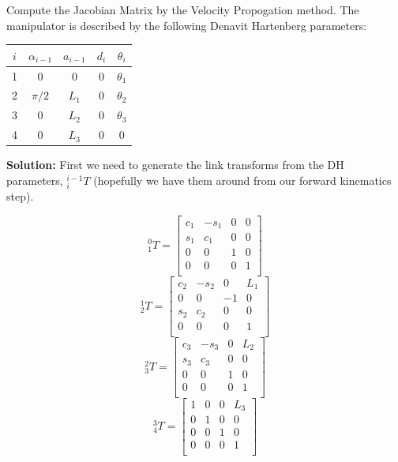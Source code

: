 \begin{Example}\label{JacobianExampleOne}
Compute the Jacobian Matrix by the Velocity Propogation method.  The manipulator is described by the following Denavit Hartenberg parameters:

\begin{center}
\begin{tabular}{|c|c|c|c|c|}
\hline
$i$	& $\alpha_{i-1}$	& $a_{i-1}$	& $d_i$		& $\theta_i$  \\ \hline
1	& 0			& 0		& 0		& $\theta_1$  \\ \hline
2	& $\pi/2$		& $L_1$		& 0		& $\theta_2$	\\ \hline
3	& 0			& $L_2$		& 0		& $\theta_3$	\\ \hline
4	& 0			& $L_3$		& 0		& 0		\\ \hline
\end{tabular}
\end{center}

\vspace{0.15in}
\textbf{Solution: }
First we need to generate the link transforms from the DH parameters, $^{i-1}_iT$
(hopefully we have them around from our forward kinematics step).

\[
^0_1T  =
\left [
\begin{array}{cccc}
c_1	& -s_1	& 0	& 0	\\
s_1	& c_1	& 0	& 0	\\
0	& 0	& 1	& 0	\\
0	& 0	& 0	& 1	\\
\end{array}
\right ]
\]
\[
^1_2T  =
\left [
\begin{array}{cccc}
c_2	& -s_2	& 0	& L_1	\\
0	& 0	& -1	& 0	\\
s_2	& c_2	& 0	& 0	\\
0	& 0	& 0	& 1	\\
\end{array}
\right ]
\]
\[
^2_3T  =
\left [
\begin{array}{cccc}
c_3	& -s_3	& 0	& L_2	\\
s_3	& c_3	& 0	& 0	\\
0	& 0	& 1	& 0	\\
0	& 0	& 0	& 1	\\
\end{array}
\right ]
\]
\[
^3_4T  =
\left [
\begin{array}{cccc}
1	& 0	& 0	& L_3	\\
0	& 1	& 0	& 0	\\
0	& 0	& 1	& 0	\\
0	& 0	& 0	& 1	\\
\end{array}
\right ]
\]


\end{Example}
